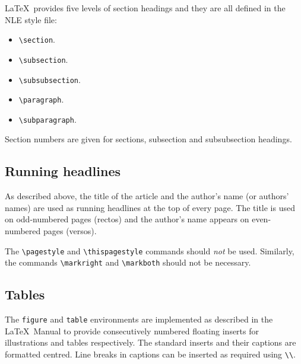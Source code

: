 \documentclass{nle}
\begin{document}
\LaTeX\ provides five levels of section headings and they are all
defined in the NLE style file:
\begin{itemize}
  \item \verb"\section".
  \item \verb"\subsection".
  \item \verb"\subsubsection".
  \item \verb"\paragraph".
  \item \verb"\subparagraph".
\end{itemize}
Section numbers are given for sections, subsection and subsubsection headings.

\subsection{Running headlines}

As described above, the title of the article and the author's name (or authors'
names) are used as running headlines at the top of every page.
The title is used on odd-numbered pages (rectos) and the author's name appears
on even-numbered pages (versos).

The \verb"\pagestyle" and \verb"\thispagestyle" commands should {\em not\/} be
used.
Similarly, the commands \verb"\markright" and \verb"\markboth" should not be
necessary.


\subsection{Tables}

The {\tt figure} and {\tt table} environments are implemented as described in
the \LaTeX\ Manual to
provide consecutively numbered floating inserts for illustrations and tables
respectively.
The standard inserts and their captions are formatted centred.
Line breaks in captions can be inserted as required using \verb"\\".
\end{document}
